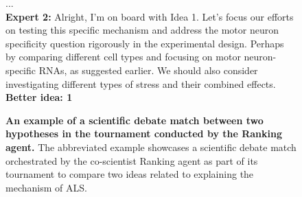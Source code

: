 \begin{figure}[htbp!]
\begin{tcolorbox}
...\\

\textbf{Expert 2:} Alright, I'm on board with Idea 1. Let's focus our efforts on testing this specific mechanism and address the motor neuron specificity question rigorously in the experimental design. Perhaps by comparing different cell types and focusing on motor neuron-specific RNAs, as suggested earlier. We should also consider investigating different types of stress and their combined effects.\\

\textbf{Better idea: 1}
\end{tcolorbox}
\vspace{0.1cm}
\caption{\textbf{An example of a scientific debate match between two hypotheses in the tournament conducted by the Ranking agent.} The abbreviated example showcases a scientific debate match orchestrated by the co-scientist Ranking agent as part of its tournament to compare two ideas related to explaining the mechanism of ALS.}
\label{fig:ex_ranking}
\end{figure}


